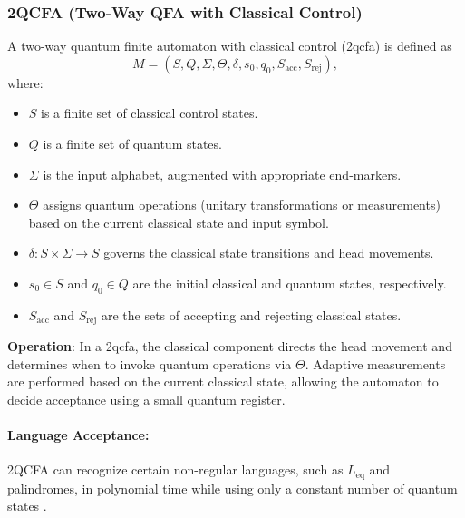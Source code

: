 \subsubsection{2QCFA (Two-Way QFA with Classical Control)}
\label{sssec:2qcfa}
\begin{definition}[2QCFA]
A two-way quantum finite automaton with classical control (\gls{2qcfa}) is defined as 
\[
M = (S, Q, \Sigma, \Theta, \delta, s_0, q_0, S_{\text{acc}}, S_{\text{rej}}),
\]
where:
\begin{itemize}
    \item \( S \) is a finite set of classical control states.
    \item \( Q \) is a finite set of quantum states.
    \item \( \Sigma \) is the input alphabet, augmented with appropriate end-markers.
    \item \( \Theta \) assigns quantum operations (unitary transformations or measurements) based on the current classical state and input symbol.
    \item \( \delta: S \times \Sigma \to S \) governs the classical state transitions and head movements.
    \item \( s_0 \in S \) and \( q_0 \in Q \) are the initial classical and quantum states, respectively.
    \item \( S_{\text{acc}} \) and \( S_{\text{rej}} \) are the sets of accepting and rejecting classical states.
\end{itemize}
\end{definition}

\textbf{Operation}:  
In a \gls{2qcfa}, the classical component directs the head movement and determines when to invoke quantum operations via \( \Theta \). Adaptive measurements are performed based on the current classical state, allowing the automaton to decide acceptance using a small quantum register.

\paragraph{Language Acceptance:}  
2QCFA can recognize certain non-regular languages, such as \( L_{\text{eq}} \) and palindromes, in polynomial time while using only a constant number of quantum states \cite{ambainis2002quantum}.


